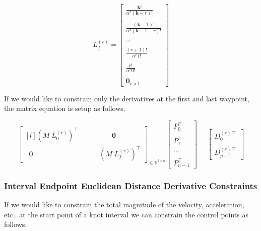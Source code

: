 \documentclass{article}
\begin{document}
\begin{equation}
L_f^{(r)} = \begin{bmatrix}
    \frac{\textbf{k}!}{ \alpha^{r} (\textbf{k}-r)!} \\ \\ 
    \frac{ (\textbf{k}-1)!}{ \alpha^{r} (\textbf{k}-1-r)!} \\ \\ 
    ... \\ \\ 
    \frac{(r+1)!}{\alpha^{r} 1!} \\ \\ 
    \frac{r!}{\alpha^r 0!} \\ \\ 
    \textbf{0}_{r \times 1} \end{bmatrix}
\end{equation}

If we would like to constrain only the derivatives at the first and last waypoint, the matrix equation is setup as follows.

\begin{equation}
    \begin{bmatrix*}[l] (M \; L_0^{(r)})^{\intercal} & \qquad \qquad \textbf{0} \\
    \;\; \textbf{0} & \;\;\;\;\;\;\;\; (M \; L_f^{(r)})^{\intercal}
    \end{bmatrix*}_{\in \mathbb{R}^{2 \times n}} 
    \begin{bmatrix}
        P_0^{\intercal} \\\\ P_1^\intercal \\\\ ... \\\\ P_{n-1}^\intercal
    \end{bmatrix} = 
    \begin{bmatrix} D_0^{(r)\intercal} \\\\ D_{p-1}^{(r)\intercal} \end{bmatrix}
\end{equation}

\subsubsection{Interval Endpoint Euclidean Distance Derivative Constraints}

If we would like to constrain the total magnitude of the velocity, acceleration, etc.. at the start point of a knot interval we can constrain the control points as follows.
\end{document}
